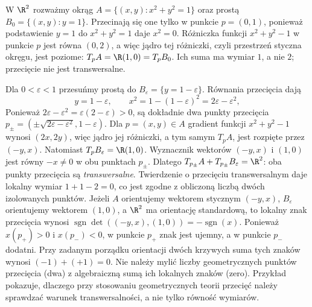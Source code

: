 \begin{przyklad}
\label{prz:at30-transwersalnosc-prostych}
W $\R^2$ rozważmy okrąg
$A=\{(x,y):x^2+y^2=1\}$ oraz prostą
$B_0=\{(x,y):y=1\}$.
Przecinają się one tylko w punkcie $p=(0,1)$,
ponieważ podstawienie $y=1$ do $x^2+y^2=1$
daje $x^2=0$.
Różniczka funkcji $x^2+y^2-1$ w punkcie $p$
jest równa $(0,2)$, a więc jądro tej różniczki,
czyli przestrzeń styczna okręgu, jest poziome:
$T_pA=\R(1,0)=T_pB_0$.
Ich suma ma wymiar $1$, a nie $2$;
przecięcie nie jest transwersalne.

Dla $0<\varepsilon<1$ przesuńmy prostą do
$B_\varepsilon=\{y=1-\varepsilon\}$.
Równania przecięcia dają
\[
 y=1-\varepsilon,\qquad
 x^2=1-(1-\varepsilon)^2=2\varepsilon-\varepsilon^2,
\]
Ponieważ $2\varepsilon-\varepsilon^2
=\varepsilon(2-\varepsilon)>0$,
są dokładnie dwa punkty przecięcia
$p_\pm=(\pm\sqrt{2\varepsilon-\varepsilon^2},1-\varepsilon)$.
Dla $p=(x,y)\in A$ gradient
funkcji $x^2+y^2-1$ wynosi $(2x,2y)$,
więc jądro jej różniczki, a tym samym
$T_pA$, jest rozpięte przez $(-y,x)$.
Natomiast $T_pB_\varepsilon=\R(1,0)$.
Wyznacznik wektorów $(-y,x)$ i $(1,0)$ jest równy
$-x\ne0$ w obu punktach $p_\pm$.
Dlatego $T_{p_\pm}A+T_{p_\pm}B_\varepsilon=\R^2$:
oba punkty przecięcia są \emph{transwersalne}.
Twierdzenie o przecięciu transwersalnym daje
lokalny wymiar $1+1-2=0$, co jest zgodne
z obliczoną liczbą dwóch izolowanych punktów.
Jeżeli $A$ orientujemy wektorem stycznym $(-y,x)$,
$B_\varepsilon$ orientujemy wektorem $(1,0)$,
a $\R^2$ ma orientację standardową, to lokalny znak
przecięcia wynosi
$\operatorname{sgn}\det((-y,x),(1,0))=-\operatorname{sgn}(x)$.
Ponieważ $x(p_+)>0$ i $x(p_-)<0$,
w punkcie $p_+$ znak jest ujemny, a w punkcie
$p_-$ dodatni. Przy zadanym porządku orientacji
dwóch krzywych suma tych znaków wynosi
$(-1)+(+1)=0$.
Nie należy mylić liczby geometrycznych punktów przecięcia
(dwa) z algebraiczną sumą ich lokalnych znaków (zero).
Przykład pokazuje, dlaczego przy stosowaniu
geometrycznych teorii przecięć należy sprawdzać
warunek transwersalności, a nie tylko równość
wymiarów.
\end{przyklad}

